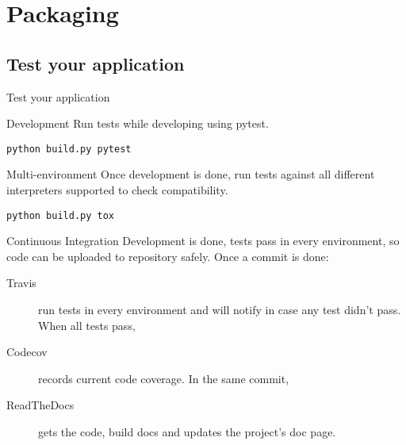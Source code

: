\section{Packaging}
\subsection{Test your application}
\begin{frame}[fragile]{Test your application}
    \begin{block}{Development}
        Run tests while developing using pytest.
        \begin{verbatim}
python build.py pytest
        \end{verbatim}
    \end{block}
    \pause
    \begin{block}{Multi-environment}
        Once development is done, run tests against all different interpreters supported to check compatibility.
        \begin{verbatim}
python build.py tox
        \end{verbatim}
    \end{block}
    \pause
    \begin{block}{Continuous Integration}
        Development is done, tests pass in every environment, so code can be uploaded to repository safely. Once a commit is done:
        \begin{description}
            \item[Travis] run tests in every environment and will notify in case any test didn't pass. When all tests pass,
            \item[Codecov] records current code coverage. In the same commit,
            \item[ReadTheDocs] gets the code, build docs and updates the project's doc page.
        \end{description}
    \end{block}
\end{frame}

